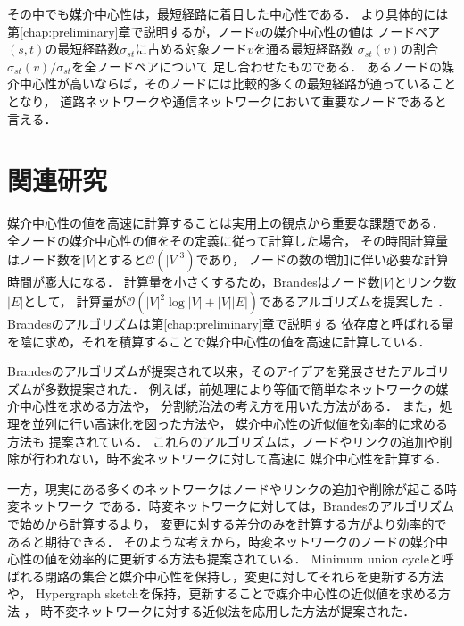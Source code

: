その中でも媒介中心性\cite{Freeman1977}は，最短経路に着目した中心性である．
より具体的には第\ref{chap:preliminary}章で説明するが，ノード$v$の媒介中心性の値は
ノードペア$(s,t)$の最短経路数$\sigma_{st}$に占める対象ノード$v$を通る最短経路数
$\sigma_{st}(v)$の割合$\sigma_{st}(v)/\sigma_{st}$を全ノードペアについて
足し合わせたものである．
あるノードの媒介中心性が高いならば，そのノードには比較的多くの最短経路が通っていることとなり，
道路ネットワークや通信ネットワークにおいて重要なノードであると言える．

\section{関連研究}

媒介中心性の値を高速に計算することは実用上の観点から重要な課題である．
全ノードの媒介中心性の値をその定義に従って計算した場合，
その時間計算量はノード数を$|V|$とすると$\mathcal{O}(|V|^3)$であり，
ノードの数の増加に伴い必要な計算時間が膨大になる．
計算量を小さくするため，Brandesはノード数$|V|$とリンク数$|E|$として，
計算量が$\mathcal{O}(|V|^2\log|V|+|V||E|)$であるアルゴリズムを提案した
\cite{Brandes2001}．Brandesのアルゴリズムは第\ref{chap:preliminary}章で説明する
依存度と呼ばれる量を陰に求め，それを積算することで媒介中心性の値を高速に計算している．

Brandesのアルゴリズムが提案されて以来，そのアイデアを発展させたアルゴリズムが多数提案された．
例えば，前処理により等価で簡単なネットワークの媒介中心性を求める方法\cite{Puzis2012,Bentert2018}や，
分割統治法の考え方を用いた方法\cite{Erdos2015}がある．
また，処理を並列に行い高速化を図った方法\cite{Bader2006,Tan2009,Edmonds2010,Bernaschi2016}や，
媒介中心性の近似値を効率的に求める方法\cite{Brandes2007,Bader2007,Pfeffer2012,Yoshida2014}も
提案されている．
これらのアルゴリズムは，ノードやリンクの追加や削除が行われない，時不変ネットワークに対して高速に
媒介中心性を計算する．

一方，現実にある多くのネットワークはノードやリンクの追加や削除が起こる時変ネットワーク\cite{Holme2012}
である．時変ネットワークに対しては，Brandesのアルゴリズムで始めから計算するより，
変更に対する差分のみを計算する方がより効率的であると期待できる．
そのような考えから，時変ネットワークのノードの媒介中心性の値を効率的に更新する方法も提案されている．
Minimum union cycleと呼ばれる閉路の集合と媒介中心性を保持し，変更に対してそれらを更新する方法
\cite{Lee2012,Singh2015}や，
Hypergraph sketch\cite{Yoshida2014}を保持，更新することで媒介中心性の近似値を求める方法
\cite{Hayashi2015}，
時不変ネットワークに対する近似法を応用した方法\cite{Bergamini2015a,Bergamini2015b}が提案された．

